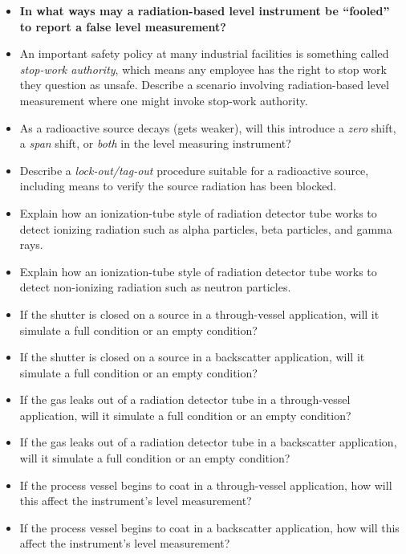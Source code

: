 \begin{itemize}
\item{} {\bf In what ways may a radiation-based level instrument be ``fooled'' to report a false level measurement?}
\item{} An important safety policy at many industrial facilities is something called {\it stop-work authority}, which means any employee has the right to stop work they question as unsafe.  Describe a scenario involving radiation-based level measurement where one might invoke stop-work authority.
\item{} As a radioactive source decays (gets weaker), will this introduce a {\it zero} shift, a {\it span} shift, or {\it both} in the level measuring instrument?
\item{} Describe a {\it lock-out/tag-out} procedure suitable for a radioactive source, including means to verify the source radiation has been blocked.
\item{} Explain how an ionization-tube style of radiation detector tube works to detect ionizing radiation such as alpha particles, beta particles, and gamma rays.
\item{} Explain how an ionization-tube style of radiation detector tube works to detect non-ionizing radiation such as neutron particles.
\item{} If the shutter is closed on a source in a through-vessel application, will it simulate a full condition or an empty condition?
\item{} If the shutter is closed on a source in a backscatter application, will it simulate a full condition or an empty condition?
\item{} If the gas leaks out of a radiation detector tube in a through-vessel application, will it simulate a full condition or an empty condition?
\item{} If the gas leaks out of a radiation detector tube in a backscatter application, will it simulate a full condition or an empty condition?
\item{} If the process vessel begins to coat in a through-vessel application, how will this affect the instrument's level measurement?
\item{} If the process vessel begins to coat in a backscatter application, how will this affect the instrument's level measurement?
\end{itemize}










